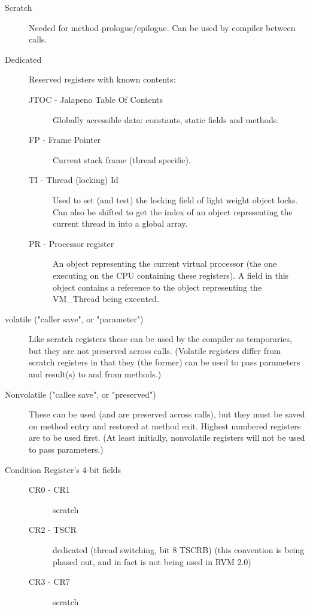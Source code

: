 \begin{description}
\item [Scratch]
     Needed for method prologue/epilogue.  Can be used by compiler between
     calls.

\item[Dedicated]
     Reserved registers with known contents:
\begin{description}
\item [JTOC - Jalapeno Table Of Contents]
        Globally accessible data: constants, static fields and methods.

\item [FP - Frame Pointer]
        Current stack frame (thread specific).

\item [TI - Thread (locking) Id]
        Used to set (and test) the locking field of light weight object
        locks.  Can also be shifted to get the index of an object
        representing the current thread in into a global array.

\item [PR - Processor register]
        An object representing the current virtual processor (the one
        executing on the CPU containing these registers).  A field in
        this object contains a reference to the object representing
        the VM\_Thread being executed.
\end{description}

\item [volatile ("caller save", or "parameter")]
     Like scratch registers these can be used by the compiler as
     temporaries, but they are not preserved across calls.  (Volatile
     registers differ from scratch registers in that they (the former)
     can be used to pass parameters and result(s) to and from
     methods.)

\item [Nonvolatile ("callee save", or "preserved")]
     These can be used (and are preserved across calls), but they must be
     saved on method entry and restored at method exit.  Highest numbered
     registers are to be used first.  (At least initially, nonvolatile
     registers will not be used to pass parameters.)

\item[Condition Register's 4-bit fields]
\begin{description}
\item    [CR0 - CR1] scratch

\item    [CR2 - TSCR] dedicated (thread switching, bit 8 TSCRB) (this
     convention is being phased out, and in fact is not being used in RVM 2.0)

\item    [CR3 - CR7] scratch
\end{description}
\end{description}


